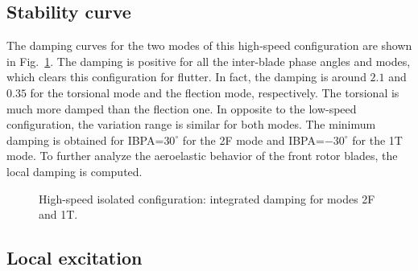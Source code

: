 

\subsection{Stability curve}
\label{sub:dream_hs_ael_curve}

The damping curves for the two modes of this high-speed
configuration are shown in Fig.~\ref{fig:dream_hs_ael_damping}.
The damping is positive for all the inter-blade phase angles
and modes, which clears this configuration for flutter.
In fact, the damping is around $2.1$ and $0.35$
for the torsional mode and the flection mode, respectively.
The torsional is much more damped than the flection one.
In opposite to the low-speed configuration, the 
variation range is similar for both modes. 
The minimum damping is obtained for IBPA=$30^\circ$
for the 2F mode and IBPA=$-30^\circ$ for the 1T mode.
To further analyze the aeroelastic behavior of the front rotor 
blades, the local damping is computed.
\begin{figure}[htp]
  \centering
  \caption{High-speed isolated configuration: integrated damping for modes 2F and 1T.}
  \label{fig:dream_hs_ael_damping}
\end{figure}

\subsection{Local excitation}
\label{sub:dream_hs_ael_local_damping}


